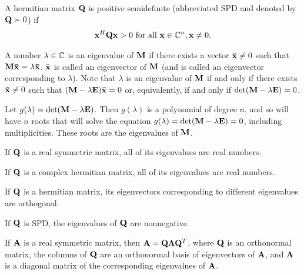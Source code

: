 \begin{definition}{}{}
    A hermitian matrix $\bold{Q}$ is positive semidefinite (abbreviated SPD and denoted by $\bold{Q}\succ 0$) if 
    \begin{align*}
        \bold{x}^H\bold{Q}\bold{x}> 0 \text{ for all } \bold{x}\in \mathbb{C}^n, \bold{x}\neq 0.
    \end{align*}
\end{definition}

A number $\lambda\in\mathbb{C}$ is an eigenvalue of $\bold{M}$ if there exists 
a vector $\bold{\bar{x}}\neq 0$ such that $\bold{M}\bold{\bar{x}}=\lambda \bold{\bar{x}}$.
$\bold{\bar{x}}$ is called an eigenvector of $\bold{M}$ (and is called an eigenvector corresponding to $\lambda$).
Note that $\lambda$ is an eigenvalue of $\bold{M}$ if and only if there exists $\bold{\bar{x}}\neq 0$ such that 
$(\bold{M}-\lambda \bold{E})\bold{\bar{x}}=0$ or, equivalently, if and only if $\text{det}(\bold{M}-\lambda \bold{E})=0$.

Let $g(\lambda)=\text{det}(\bold{M}-\lambda \bold{E})$. Then $g(\lambda)$ is 
a polynomial of degree $n$, and so will have $n$ roots 
that will solve the equation $g(\lambda)=\text{det}(\bold{M}-\lambda \bold{E})=0$, 
including multiplicities. These roots are the eigenvalues of $\bold{M}$.


\begin{proposition}{}{}
    If $\bold{Q}$ is a real symmetric matrix, all of its eigenvalues are real numbers.
\end{proposition}

\begin{proposition}{}{}
    If $\bold{Q}$ is a complex hermitian matrix, all of its eigenvalues are real numbers.
\end{proposition}

\begin{proposition}{}{}
    If $\bold{Q}$ is a hermitian matrix, 
    its eigenvectors corresponding to different eigenvalues are orthogonal.
\end{proposition}

\begin{proposition}{}{}
    If $\bold{Q}$ is SPD, the eigenvalues of $\bold{Q}$ are nonnegative.
\end{proposition}

\begin{theorem}{}{}
    If $\bold{A}$ is a real symmetric matrix, then $\bold{A}=\bold{Q}\bold{\Lambda}\bold{Q}^T$,
    where $\bold{Q}$ is an orthonormal matrix, the columns of $\bold{Q}$ are an orthonormal basis of eigenvectors of $\bold{A}$,
    and $\bold{\Lambda}$ is a diagonal matrix of the corresponding eigenvalues of $\bold{A}$.
\end{theorem}

